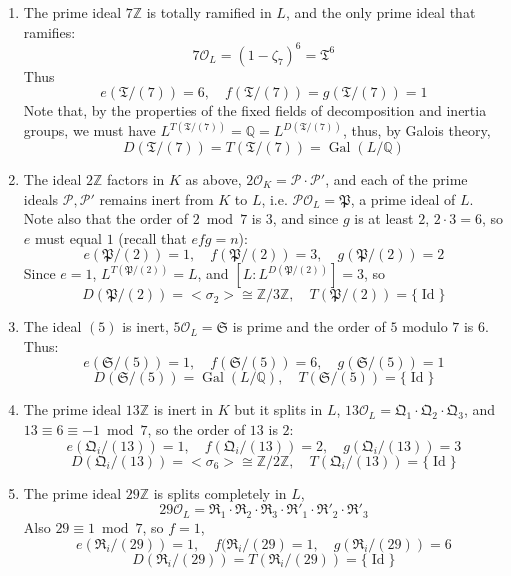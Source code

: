 \documentclass[12pt]{article}
\newcommand{\Ints}{\mathbb{Z}}
\newcommand{\Rats}{\mathbb{Q}}
\begin{document}
\begin{enumerate}
\item The prime ideal $7\Ints$ is totally ramified in $L$, and the
only prime ideal that ramifies:
$$7\mathcal{O}_L=(1-\zeta_7)^6=\mathfrak{T}^6$$
Thus
$$e(\mathfrak{T}/(7))=6,\quad f(\mathfrak{T}/(7))=g(\mathfrak{T}/(7))=1$$
Note that, by the properties of the fixed fields of decomposition
and inertia groups, we must have
$L^{T(\mathfrak{T}/(7))}=\Rats=L^{D(\mathfrak{T}/(7))}$, thus, by
Galois theory,
$$D(\mathfrak{T}/(7))=T(\mathfrak{T}/(7))=\operatorname{Gal}(L/\Rats)$$

\item The ideal $2\Ints$ factors in $K$ as above,
$2\mathcal{O}_K=\mathcal{P}\cdot\mathcal{P'}$, and each of the
prime ideals $\mathcal{P},\mathcal{P'}$ remains inert from $K$ to
$L$, i.e. $\mathcal{P}\mathcal{O}_L=\mathfrak{P}$, a prime ideal
of $L$. Note also that the order of $2\ \operatorname{mod}\ 7$ is $3$, and since $g$ is at least $2$, $2\cdot3=6$, so $e$ must equal $1$ (recall that $efg=n$):
$$e(\mathfrak{P}/(2))=1,\quad f(\mathfrak{P}/(2))=3,\quad g(\mathfrak{P}/(2))=2$$
Since $e=1$, $L^{T(\mathfrak{P}/(2))}=L$, and $[L\colon
L^{D(\mathfrak{P}/(2))}]=3$, so
$$D(\mathfrak{P}/(2))=<\sigma_2>\cong \Ints/3\Ints,\quad
T(\mathfrak{P}/(2))=\{\operatorname{Id}\}$$

\item The ideal $(5)$ is inert, $5\mathcal{O}_L=\mathfrak{S}$ is
prime and the order of $5$ modulo $7$ is $6$. Thus:
$$e(\mathfrak{S}/(5))=1,\quad f(\mathfrak{S}/(5))=6,\quad
g(\mathfrak{S}/(5))=1$$
$$D(\mathfrak{S}/(5))=\operatorname{Gal}(L/\Rats),\quad
T(\mathfrak{S}/(5))=\{\operatorname{Id}\}$$

\item The prime ideal $13\Ints$ is inert in $K$ but it splits in
$L$,
$13\mathcal{O}_L=\mathfrak{Q}_1\cdot\mathfrak{Q}_2\cdot\mathfrak{Q}_3$, and $13\equiv 6\equiv -1\ \operatorname{mod}\ 7$, so the order of $13$ is $2$:
$$e(\mathfrak{Q}_i/(13))=1,\quad f(\mathfrak{Q}_i/(13))=2,\quad
g(\mathfrak{Q}_i/(13))=3$$
$$D(\mathfrak{Q}_i/(13))=<\sigma_6>\cong\Ints/2\Ints,\quad
T(\mathfrak{Q}_i/(13))=\{\operatorname{Id}\}$$

\item The prime ideal $29\Ints$ is splits completely in $L$,
$$29\mathcal{O}_L=\mathfrak{R}_1\cdot\mathfrak{R}_2\cdot\mathfrak{R}_3\cdot\mathfrak{R'}_1\cdot\mathfrak{R'}_2\cdot\mathfrak{R'}_3$$
Also $29\equiv 1\ \operatorname{mod}\ 7$, so $f=1$,
$$e(\mathfrak{R}_i/(29))=1,\quad f(\mathfrak{R}_i/(29)=1,\quad
g(\mathfrak{R}_i/(29))=6$$
$$D(\mathfrak{R}_i/(29))=T(\mathfrak{R}_i/(29))=\{\operatorname{Id}\}$$
\end{enumerate}
\end{document}
